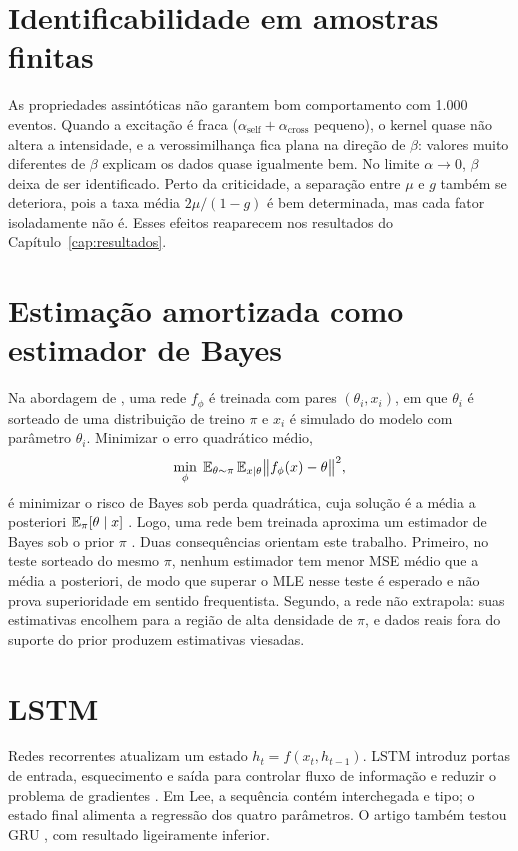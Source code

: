 \documentclass[12pt,a4paper,openany]{report}
\begin{document}
\section{Identificabilidade em amostras finitas}
\label{sec:identificabilidade}

As propriedades assintóticas não garantem bom comportamento com 1.000 eventos. Quando
a excitação é fraca (\(\alpha_{\mathrm{self}}+\alpha_{\mathrm{cross}}\) pequeno), o
kernel quase não altera a intensidade, e a verossimilhança fica plana na direção de
\(\beta\): valores muito diferentes de \(\beta\) explicam os dados quase igualmente bem.
No limite \(\alpha\to0\), \(\beta\) deixa de ser identificado. Perto da criticidade,
a separação entre \(\mu\) e \(g\) também se deteriora, pois a taxa média
\(2\mu/(1-g)\) é bem determinada, mas cada fator isoladamente não é. Esses efeitos
reaparecem nos resultados do Capítulo~\ref{cap:resultados}.

\section{Estimação amortizada como estimador de Bayes}
\label{sec:bayes}

Na abordagem de \citet{lee2023}, uma rede \(f_\phi\) é treinada com pares
\((\theta_i,x_i)\), em que \(\theta_i\) é sorteado de uma distribuição de treino
\(\pi\) e \(x_i\) é simulado do modelo com parâmetro \(\theta_i\). Minimizar o erro
quadrático médio,
\[
  \min_\phi\;\mathbb{E}_{\theta\sim\pi}\,\mathbb{E}_{x\mid\theta}
  \bigl\lVert f_\phi(x)-\theta\bigr\rVert^2,
\]
é minimizar o risco de Bayes sob perda quadrática, cuja solução é a média a
posteriori \(\mathbb{E}_\pi[\theta\mid x]\) \citep{lehmann1998}. Logo, uma rede bem treinada
aproxima um estimador de Bayes sob o prior \(\pi\)
\citep{sainsburydale2024,lenzi2023}. Duas consequências orientam este trabalho.
Primeiro, no teste sorteado do mesmo \(\pi\), nenhum estimador tem menor MSE médio
que a média a posteriori, de modo que superar o MLE nesse teste é esperado e não prova
superioridade em sentido frequentista. Segundo, a rede não extrapola: suas estimativas
encolhem para a região de alta densidade de \(\pi\), e dados reais fora do suporte do
prior produzem estimativas viesadas.

\section{LSTM}

Redes recorrentes atualizam um estado \(h_t=f(x_t,h_{t-1})\). LSTM introduz portas de
entrada, esquecimento e saída para controlar fluxo de informação e reduzir o problema
de gradientes \citep{hochreiter1997}. Em Lee, a sequência contém interchegada e tipo;
o estado final alimenta a regressão dos quatro parâmetros. O artigo também testou GRU
\citep{cho2014}, com resultado ligeiramente inferior.
\end{document}
